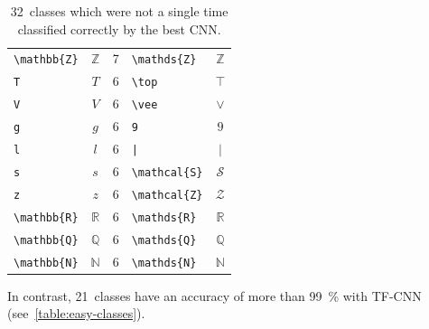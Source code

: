 \begin{table}[h]
\begin{tabular}{lcrlc}
    \verb+\mathbb{Z}+ & $\mathbb{Z}$ & 7 & \verb+\mathds{Z}+ & $\mathds{Z}$ \\
    \verb+T+ & $T$ & 6 & \verb+\top+ & $\top$ \\
    \verb+V+ & $V$ & 6 & \verb+\vee+ & $\vee$ \\
    \verb+g+ & $g$ & 6 & \verb+9+ & $9$ \\
    \verb+l+ & $l$ & 6 & \verb+|+ & $|$ \\
    \verb+s+ & $s$ & 6 & \verb+\mathcal{S}+ & $\mathcal{S}$ \\
    \verb+z+ & $z$ & 6 & \verb+\mathcal{Z}+ & $\mathcal{Z}$ \\
    \verb+\mathbb{R}+ & $\mathbb{R}$ & 6 & \verb+\mathds{R}+ & $\mathds{R}$ \\
    \verb+\mathbb{Q}+ & $\mathbb{Q}$ & 6 & \verb+\mathds{Q}+ & $\mathds{Q}$ \\
    \verb+\mathbb{N}+ & $\mathbb{N}$ & 6 & \verb+\mathds{N}+ & $\mathds{N}$ \\
    \bottomrule
    \end{tabular}
    \caption{32~classes which were not a single time classified correctly by
             the best CNN.}
    \label{table:hard-classes}
\end{table}

In contrast, 21~classes have an accuracy of more than \SI{99}{\percent} with
TF-CNN (see~\cref{table:easy-classes}).

